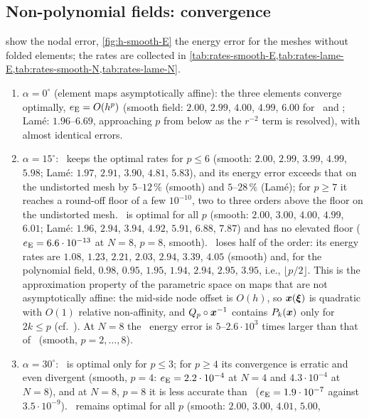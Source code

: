 \subsection{Non-polynomial fields: convergence}\label{sec:conv}
 show the nodal error, \cref{fig:h-smooth-E} the energy
error for the meshes without folded elements; the rates are collected in
\cref{tab:rates-smooth-E,tab:rates-lame-E,tab:rates-smooth-N,tab:rates-lame-N}.
\begin{enumerate}
\item $\alpha=0^\circ$ (element maps asymptotically affine): the three elements converge
  optimally, $e_{\mathrm{E}}=O(h^p)$ (smooth field: $2.00$, $2.99$, $4.00$, $4.99$, $6.00$ for
  \PM\ and \PH; Lam\'e: $1.96$--$6.69$, approaching $p$ from below as the $r^{-2}$ term is
  resolved), with almost identical errors.
\item $\alpha=15^\circ$: \PM\ keeps the optimal rates for $p\le6$ (smooth: $2.00$,
  $2.99$, $3.99$, $4.99$, $5.98$; Lam\'e: $1.97$, $2.91$, $3.90$, $4.81$, $5.83$), and its energy
  error exceeds that on the undistorted mesh by $5$--$12\,\%$ (smooth) and $5$--$28\,\%$
  (Lam\'e); for $p\ge7$ it reaches a round-off floor of a few $10^{-10}$, two to three orders
  above the floor on the undistorted mesh. \PH\ is optimal for all $p$ (smooth: $2.00$, $3.00$,
  $4.00$, $4.99$, $6.01$; Lam\'e: $1.96$, $2.94$, $3.94$, $4.92$, $5.91$, $6.88$, $7.87$) and has no
  elevated floor ($e_{\mathrm{E}}=6.6\cdot10^{-13}$ at $N=8$, $p=8$, smooth). \PP\ loses half of the order:
  its energy rates are $1.08$, $1.23$, $2.21$, $2.03$, $2.94$, $3.39$, $4.05$ (smooth) and, for
  the polynomial field, $0.98$, $0.95$, $1.95$, $1.94$, $2.94$, $2.95$, $3.95$, i.e.,
  $\lfloor p/2\rfloor$. This is the approximation property of the parametric space on maps that
  are not asymptotically affine: the mid-side node offset is $O(h)$, so $\bm{x}(\bm{\xi})$ is quadratic
  with $O(1)$ relative non-affinity, and $Q_p\circ\bm{x}^{-1}$ contains $P_k(\bm{x})$ only for $2k\le p$
  (cf.\ \citep{Arnold2002Approximation,Ciarlet1972Interpolation}). At $N=8$ the \PP\ energy
  error is $5$--$2.6\cdot10^3$ times larger than that of \PH\ (smooth, $p=2,\dots,8$).
\item $\alpha=30^\circ$: \PM\ is optimal only for $p\le3$; for $p\ge4$ its convergence is erratic
  and even divergent (smooth, $p=4$: $e_{\mathrm{E}}=2.2\cdot10^{-4}$ at $N=4$ and $4.3\cdot10^{-4}$ at
  $N=8$), and at $N=8$, $p=8$ it is less accurate than \PP\ ($e_{\mathrm{E}}=1.9\cdot10^{-7}$ against
  $3.5\cdot10^{-9}$). \PH\ remains optimal for all $p$ (smooth: $2.00$, $3.00$, $4.01$, $5.00$,

\end{enumerate}
